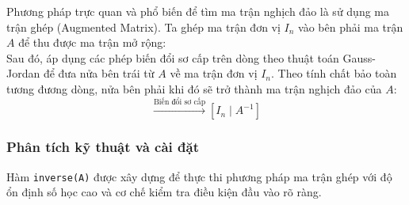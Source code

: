 \documentclass[12pt,a4paper]{article}
\begin{document}
Phương pháp trực quan và phổ biến để tìm ma trận nghịch đảo là sử dụng ma trận ghép (Augmented Matrix). Ta ghép ma trận đơn vị $I_n$ vào bên phải ma trận $A$ để thu được ma trận mở rộng:
\begin{equation}
[A \mid I_n]
\end{equation}
Sau đó, áp dụng các phép biến đổi sơ cấp trên dòng theo thuật toán Gauss-Jordan để đưa nửa bên trái từ $A$ về ma trận đơn vị $I_n$. Theo tính chất bảo toàn tương đương dòng, nửa bên phải khi đó sẽ trở thành ma trận nghịch đảo của $A$:
\begin{equation}
[A \mid I_n] \xrightarrow{\text{Biến đổi sơ cấp}} [I_n \mid A^{-1}]
\end{equation}

\subsubsection{Phân tích kỹ thuật và cài đặt}

Hàm \texttt{inverse(A)} được xây dựng để thực thi phương pháp ma trận ghép với độ ổn định số học cao và cơ chế kiểm tra điều kiện đầu vào rõ ràng.
\end{document}
